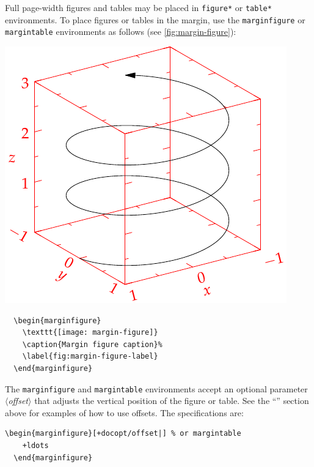 \documentclass[a4paper]{tufte-handout}
\newcommand{\hlorange}[1]{\textcolor{tufte-orange}{#1}}
\newcommand{\docopt}[1]{\( \langle \)\textrm{\textit{#1}}\( \rangle \)}
\newcommand{\docenv}[1]{\hlorange{\texttt{#1}}}
\begin{document}
Full page-width figures and tables may be placed in \docenv{figure*} or \docenv{table*} environments.
To place figures or tables in the margin, use the \docenv{marginfigure} or \docenv{margintable} environments as follows (see \cref{fig:margin-figure}):
\begin{marginfigure}%
  \includegraphics[width=\linewidth]{helix}
  \caption[This is an example of a margin figure]{%
    This is a margin figure. 
    The helix is defined by \(x = \cos(2\pi z)\), \(y = \sin(2\pi z)\), and \(z = [0, 2.7]\). 
    The figure was drawn using \href{http://asymptote.sf.net/}{Asymptote} (\url{http://asymptote.sf.net/}).
  }\label{fig:margin-figure}
\end{marginfigure}
\noindent
\begin{Verbatim}
  \begin{marginfigure}
    \texttt{[image: margin-figure]}
    \caption{Margin figure caption}%
    \label{fig:margin-figure-label}
  \end{marginfigure}
\end{Verbatim}

The \docenv{marginfigure} and \docenv{margintable} environments accept an optional parameter \docopt{offset} that adjusts the vertical position of the figure or table. 
See the ``'' section above for examples of how to use offsets.
The specifications are:
\noindent
\begin{Verbatim}[commandchars=+/|]
  \begin{marginfigure}[+docopt/offset|] % or margintable
    +ldots
  \end{marginfigure}
\end{Verbatim}
\end{document}
